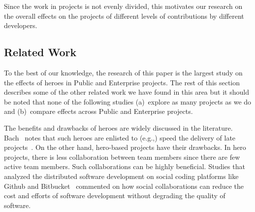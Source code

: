 \documentclass[sigconf]{acmart}
\theoremstyle{break}
\begin{document}
Since the work in projects is not evenly divided, this motivates our research on the overall
effects on the projects of different levels of contributions by different developers.




\subsection{Related Work}
\label{sec:related}

To the best of our knowledge, the research of this paper is    the largest study on the effects of heroes in 
Public   and Enterprise projects. The rest of this section describes some of the other related
work we have found in this area but it should be noted that none of the following studies
(a)~explore as many projects as we do and (b)~compare effects across Public and Enterprise projects.


The benefits and drawbacks of heroes are widely discussed in the literature.
Bach~\cite{bach1995enough} notes that such heroes are enlisted to  (e.g.,) speed the delivery of late projects~\cite{cullom2006software}.   
On the other hand, hero-based projects have their drawbacks. In hero
projects, there is less collaboration between team members since there
are few active team members. Such collaborations can be highly beneficial.
Studies that analyzed the distributed software development on social coding platforms like Github and Bitbucket~\cite{dias2016does,cosentino2017systematic} commented on how social collaborations can reduce the cost and efforts of software development without degrading the quality of software. 
\end{document}
